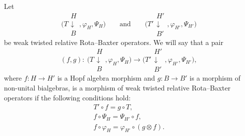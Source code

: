 \documentclass[10pt,a4paper]{amsart}
\numberwithin{equation}{section}
\begin{document}
\begin{Definition}
Let
\[
\Biggl(T\begin{array}{c}H\\\downarrow\\B\end{array},\varphi_{H},\Psi_{H}\Biggr) \qquad \text{and} \qquad \Biggl(T'\begin{array}{c}H'\\\downarrow\\B'\end{array},\varphi_{H'},\Psi_{H'}\Biggr)
\] be weak twisted relative Rota--Baxter operators. We will say that a pair
\[
(f,g)\colon \ \Biggl(T\begin{array}{c}H\\\downarrow\\B\end{array},\varphi_{H},\Psi_{H}\Biggr)\rightarrow \Biggl(T'\begin{array}{c}H'\\\downarrow\\B'\end{array},\varphi_{H'},\Psi_{H'}\Biggr),
\]
where $f\colon H\rightarrow H'$ is a Hopf algebra morphism and $g\colon B\rightarrow B'$ is a morphism of non-unital bialgebras, is a morphism of weak twisted relative Rota--Baxter operators if the following conditions hold:
\begin{gather}
\label{mor0twrRb}
T'\circ f=g\circ T,\\
\label{mor1twrRb}
f\circ \Psi_{H}=\Psi_{H'}\circ f,\\
\label{mor2.0twrRb}
f\circ \varphi_{H}=\varphi_{H'}\circ(g\otimes f).
\end{gather}
\end{Definition}
\end{document}
